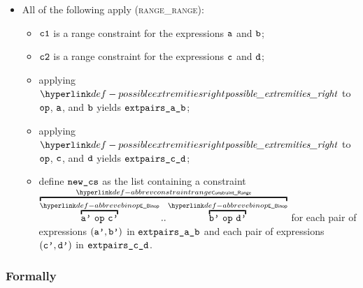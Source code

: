 \begin{itemize}
  \item All of the following apply (\textsc{range\_range}):
  \begin{itemize}
    \item $\vcone$ is a range constraint for the expressions $\va$ and $\vb$;
    \item $\vctwo$ is a range constraint for the expressions $\vc$ and $\vd$;
    \item applying $\possibleextremitiesright$ to $\op$, $\va$, and $\vb$ yields $\extpairsab$;
    \item applying $\possibleextremitiesright$ to $\op$, $\vc$, and $\vd$ yields $\extpairscd$;
    \item define $\newcs$ as the list containing a constraint $\AbbrevConstraintRange{\AbbrevEBinop{\op}{\vap}{\vcp}}{\AbbrevEBinop{\op}{\vbp}{\vdp}}$
          for each pair of expressions
          $(\vap, \vbp)$ in $\extpairsab$
          and each pair of expressions
          $(\vcp, \vdp)$ in $\extpairscd$.
  \end{itemize}
\end{itemize}

\subsubsection{Formally}
\begin{mathpar}
\end{mathpar}

\begin{mathpar}
\end{mathpar}

\begin{mathpar}
\end{mathpar}

